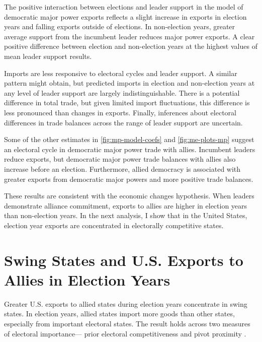 \documentclass[12pt]{article}
\begin{document}
The positive interaction between elections and leader support in the model of democratic major power exports reflects a slight increase in exports in election years and falling exports outside of elections. 
In non-election years, greater average support from the incumbent leader reduces major power exports. 
A clear positive difference between election and non-election years at the highest values of mean leader support results. 


Imports are less responsive to electoral cycles and leader support. 
A similar pattern might obtain, but predicted imports in election and non-election years at any level of leader support are largely indistinguishable. 
There is a potential difference in total trade, but given limited import fluctuations, this difference is less pronounced than changes in exports. 
Finally, inferences about electoral differences in trade balances across the range of leader support are uncertain.


Some of the other estimates in \autoref{fig:mp-model-coefs} and \autoref{fig:me-plots-mp} suggest an electoral cycle in democratic major power trade with allies.
Incumbent leaders reduce exports, but democratic major power trade balances with allies also increase before an election.
Furthermore, allied democracy is associated with greater exports from democratic major powers and more positive trade balances.


These results are consistent with the economic changes hypothesis. 
When leaders demonstrate alliance commitment, exports to allies are higher in election years than non-election years.
In the next analysis, I show that in the United States, election year exports are concentrated in electorally competitive states.



\section{Swing States and U.S. Exports to Allies in Election Years}


Greater U.S. exports to allied states during election years concentrate in swing states.
In election years, allied states import more goods than other states, especially from important electoral states.
The result holds across two measures of electoral importance--- prior electoral competitiveness and pivot proximity \citep{Wright2009}.
\end{document}
